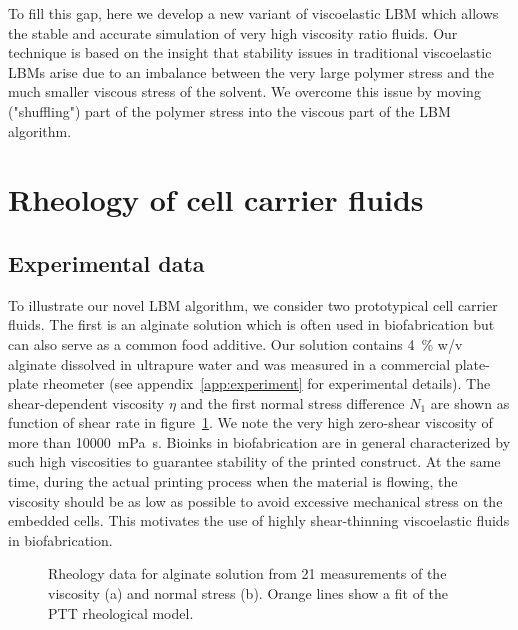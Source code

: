 \documentclass[a4paper,12pt]{scrartcl}
\begin{document}
To fill this gap, here we develop a new variant of viscoelastic LBM which allows the stable and accurate simulation of very high viscosity ratio fluids.
Our technique is based on the insight that stability issues in traditional viscoelastic LBMs arise due to an imbalance between the very large polymer stress and the much smaller viscous stress of the solvent.
We overcome this issue by moving ("shuffling") part of the polymer stress into the viscous part of the LBM algorithm.




\section{Rheology of cell carrier fluids}

\subsection{Experimental data}

To illustrate our novel LBM algorithm, we consider two prototypical cell carrier fluids.
The first is an alginate solution which is often used in biofabrication but can also serve as a common food additive.
Our solution contains \SI{4}{\percent} w/v alginate dissolved in ultrapure water and was measured in a commercial plate-plate rheometer (see appendix~\ref{app:experiment} for experimental details).
The shear-dependent viscosity $\eta$ and the first normal stress difference $N_1$ are shown as function of shear rate in figure~\ref{fig:fit_alginate}.
We note the very high zero-shear viscosity of more than \SI{10000}{\milli\pascal\second}.
Bioinks in biofabrication are in general characterized by such high viscosities to guarantee stability of the printed construct.
At the same time, during the actual printing process when the material is flowing, the viscosity should be as low as possible to avoid excessive mechanical stress on the embedded cells.
This motivates the use of highly shear-thinning viscoelastic fluids in biofabrication.
	\begin{figure}[H]
		\centering
		\caption{Rheology data for alginate solution from 21 measurements of the viscosity (a) and normal stress (b).
				Orange lines show a fit of the PTT rheological model.}
		\label{fig:fit_alginate}
	\end{figure}
\end{document}
